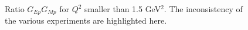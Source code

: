 \begin{figure}
\begin{center}
\caption{Ratio $G_{Ep}G_{Mp}$ for $Q^2$ smaller than 1.5 GeV$^2$. The inconsistency of the various experiments are highlighted here.}
\label{fig:gepgmp_lowq2}
\end{center}
\end{figure}

